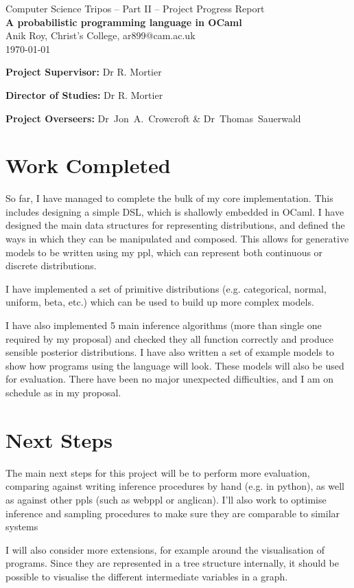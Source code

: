 \documentclass[12pt,a4paper]{article}
\begin{document}
\begin{center}
      {\Large Computer Science Tripos -- Part II -- Project Progress Report} \\
      \vspace{0.2in}
      {\huge \bf A probabilistic programming language in OCaml } \\
      \vspace{0.4in}
      {\large Anik Roy, Christ's College, ar899@cam.ac.uk} \\
      \vspace{0.1in}
      {\large \today} \\

\end{center}
\vspace{0.4in}


\vfil


\textbf{Project Supervisor:} Dr R. Mortier

\textbf{Director of Studies:} Dr R. Mortier

\textbf{Project Overseers:} Dr~Jon~A.~Crowcroft  \& Dr~Thomas~Sauerwald

\vfil
    
\section*{Work Completed}

So far, I have managed to complete the bulk of my core implementation. This includes designing a simple DSL, which is shallowly embedded in OCaml. I have designed the main data structures for representing distributions, and defined the ways in which they can be manipulated and composed. This allows for generative models to be written using my ppl, which can represent both continuous or discrete distributions. 

I have implemented a set of primitive distributions (e.g. categorical, normal, uniform, beta, etc.) which can be used to build up more complex models.

I have also implemented 5 main inference algorithms (more than single one required by my proposal) and checked they all function correctly and produce sensible posterior distributions. I have also written a set of example models to show how programs using the language will look. These models will also be used for evaluation. There have been no major unexpected difficulties, and I am on schedule as in my proposal.

\section*{Next Steps}
The main next steps for this project will be to perform more evaluation, comparing against writing inference procedures by hand (e.g. in python), as well as against other ppls (such as webppl or anglican). I'll also work to optimise inference and sampling procedures to make sure they are comparable to similar systems

I will also consider more extensions, for example around the visualisation of programs. Since they are represented in a tree structure internally, it should be possible to visualise the different intermediate variables in a graph.
\end{document}
